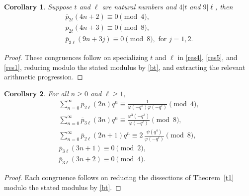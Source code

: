 \documentclass[10pt,a4paper]{amsart}
\newtheorem{corollary}{Corollary}[section]
\numberwithin{equation}{section}
\begin{document}
	\begin{corollary}\label{c1} Suppose $t$ and $\ell$ are natural numbers and $4|t$ and $9|\ell$, then
		\begin{align}
			\overline{p}_{2t}(4n+2)\equiv 0\pmod{4},\label{cor1}\\
			\overline{p}_{2t}(4n+3)\equiv 0\pmod{8},\label{cor2}\\
			\overline{p}_{3\ell}(9n+3j)\equiv 0\pmod{8}, \,\,\text{for}\,\,j=1,2.\label{cor3}
		\end{align}
	\end{corollary}
	\begin{proof}
		These congruences follow on specializing $t$ and $\ell$ in \eqref{res4}, \eqref{res5}, and \eqref{res1}, reducing modulo the stated modulus by \eqref{bt}, and extracting the relevant arithmetic progression.
	\end{proof}
	\begin{corollary}\label{c2} For all $n\geq0$ and $\ell\geq1$,
		\begin{align}
			\sum_{n=0}^{\infty}\overline{p}_{2\ell}(2n)q^n\equiv \frac{1}{\varphi(-q^2)\varphi(-q^\ell)}\pmod{4},\label{res6}\\
			\sum_{n=0}^{\infty}\overline{p}_{3\ell}(3n)q^n\equiv
			\frac{\varphi^3(-q^3)}{\varphi(-q^\ell)}\pmod{8},\label{res8}\\
			\sum_{n=0}^{\infty}\overline{p}_{2\ell}(2n+1)q^n\equiv2\,\frac{\psi(q^4)}
			{\varphi(-q^\ell)}\pmod{8}, \label{res7}\\
			\overline{p}_{3\ell}(3n+1)\equiv 0 \pmod{2},\\
			\overline{p}_{3\ell}(3n+2)\equiv0 \pmod{4}.
		\end{align}
	\end{corollary}
	\begin{proof}
		Each congruence follows on reducing the dissections of Theorem~\ref{t1} modulo the stated modulus by \eqref{bt}.
	\end{proof}
\end{document}
